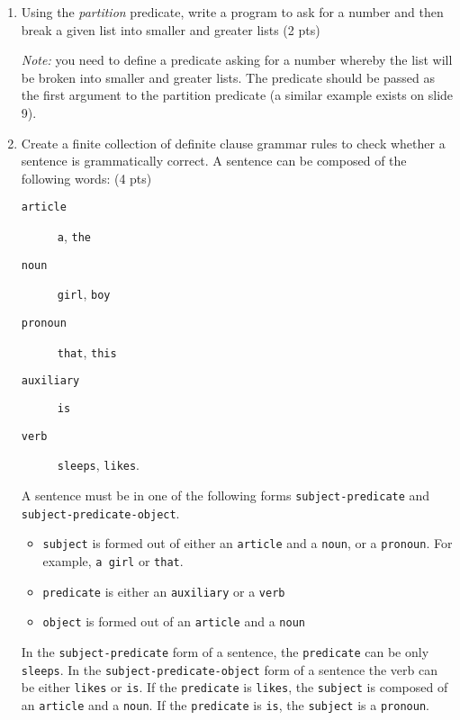\documentclass [11pt, a4wide, twoside]{article}
\begin{document}
\begin{enumerate}
\item Using the \emph{partition} predicate, write a program to ask for a number and then break a given list into smaller and greater lists (2 pts)

\emph{Note:} you need to define a predicate asking for a number whereby the list will be broken into smaller and greater lists. The predicate should be passed as the first argument to the partition predicate (a similar example exists on slide 9).

\vspace{0.5cm}

\solution{\fontsize{9pt}{11pt}}
\item Create a finite collection of definite clause grammar rules to check whether a sentence is grammatically correct. 
%
A sentence can be composed of the following words: (4 pts)
\begin{description}
	\item [\texttt{article}] \texttt{a}, \texttt{the}
	\item [\texttt{noun}] \texttt{girl}, \texttt{boy}
	\item [\texttt{pronoun}] \texttt{that}, \texttt{this}
	\item [\texttt{auxiliary}] \texttt{is}
	\item [\texttt{verb}] \texttt{sleeps}, \texttt{likes}.
\end{description}
%
A sentence must be in one of the following forms \texttt{subject-predicate} and \\ \texttt{subject-predicate-object}.
%
\begin{itemize}
\item \texttt{subject} is formed out of either an \texttt{article} and a \texttt{noun}, or a \texttt{pronoun}. For example, \texttt{a girl} or \texttt{that}.
\item \texttt{predicate} is either an \texttt{auxiliary} or a \texttt{verb}
\item \texttt{object} is formed out of an \texttt{article} and a \texttt{noun}
\end{itemize}
%
In the \texttt{subject-predicate} form of a sentence, the \texttt{predicate} can be only \texttt{sleeps}.
%
In the \texttt{subject-predicate-object} form of a sentence the verb can be either \texttt{likes} or \texttt{is}. If the \texttt{predicate} is \texttt{likes}, the 		\texttt{subject} is composed of an \texttt{article} and a \texttt{noun}. If the \texttt{predicate} is \texttt{is}, the \texttt{subject} is a \texttt{pronoun}.\\ \\

\end{enumerate}
\end{document}
